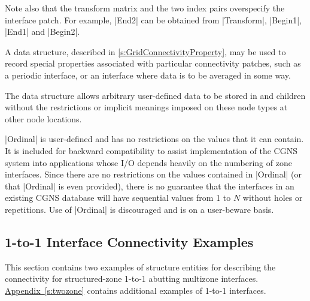 Note also that the transform matrix and the two index pairs overspecify the
interface patch.  For example, |End2| can be obtained from |Transform|,
|Begin1|, |End1| and |Begin2|.

A  data structure, described in
\autoref{s:GridConnectivityProperty}, may be used to record special
properties associated with particular connectivity patches, such as a
periodic interface, or an interface where data is to be averaged in some
way.

The  data structure allows arbitrary
user-defined data to be stored in  and
 children without the restrictions or implicit
meanings imposed on these node types at other node locations.

|Ordinal| is user-defined and has no restrictions on the values that it can
contain.  It is included for backward compatibility to assist implementation
of the CGNS system into applications whose I/O depends heavily on the
numbering of zone interfaces.  Since there are no restrictions on the values
contained in |Ordinal| (or that |Ordinal| is even provided), there is no
guarantee that the interfaces in an existing CGNS database
will have sequential values from 1 to $N$ without holes or repetitions.  Use
of |Ordinal| is discouraged and is on a user-beware basis.

\subsection{1-to-1 Interface Connectivity Examples}
\label{s:cnct_1to1_example}

This section contains two examples of structure entities for describing
the connectivity for struc\-tured-zone 1-to-1 abutting multizone
interfaces.
\hyperref[s:twozone]{Appendix~\ref*{s:twozone}} contains additional
examples of 1-to-1 interfaces.

